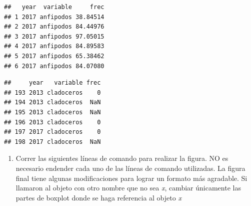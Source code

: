 \documentclass[]{book}
\providecommand{\tightlist}{%
  \setlength{\itemsep}{0pt}\setlength{\parskip}{0pt}}
\begin{document}
\begin{verbatim}
##   year  variable     frec
## 1 2017 anfipodos 38.84514
## 2 2017 anfipodos 84.44976
## 3 2017 anfipodos 97.05015
## 4 2017 anfipodos 84.89583
## 5 2017 anfipodos 65.38462
## 6 2017 anfipodos 84.07080
\end{verbatim}

\begin{verbatim}
##     year   variable frec
## 193 2013 cladoceros    0
## 194 2013 cladoceros  NaN
## 195 2013 cladoceros  NaN
## 196 2013 cladoceros    0
## 197 2017 cladoceros    0
## 198 2017 cladoceros  NaN
\end{verbatim}

\begin{enumerate}
\def\labelenumi{\arabic{enumi}.}
\setcounter{enumi}{2}
\tightlist
\item
  Correr las siguientes líneas de comando para realizar la figura. NO es necesario endender cada uno de las líneas de comando utilizadas. La figura final tiene algunas modificaciones para lograr un formato más agradable. Si llamaron al objeto con otro nombre que no sea \emph{x}, cambiar únicamente las partes de boxplot donde se haga referencia al objeto \emph{x}
\end{enumerate}
\end{document}
